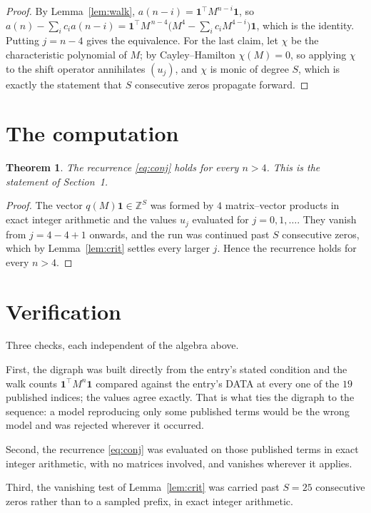 \documentclass[11pt,a4paper]{article}
\theoremstyle{plain}
\newtheorem{theorem}{Theorem}
\theoremstyle{definition}
\begin{document}
\begin{proof}
By Lemma~\ref{lem:walk}, $a(n-i)=\mathbf{1}^{\!\top}M^{n-i}\mathbf{1}$, so
$a(n)-\sum_i c_i a(n-i)
=\mathbf{1}^{\!\top}M^{\,n-4}\bigl(M^{4}-\sum_i c_i M^{4-i}\bigr)
\mathbf{1}$, which is the identity. Putting $j=n-4$ gives the equivalence. For the
last claim, let $\chi$ be the characteristic polynomial of $M$; by Cayley--Hamilton
$\chi(M)=0$, so applying $\chi$ to the shift operator annihilates $(u_j)$, and $\chi$ is
monic of degree $S$, which is exactly the statement that $S$ consecutive zeros propagate
forward.
\end{proof}

\section{The computation}

\begin{theorem}
The recurrence \eqref{eq:conj} holds for every $n>4$. This is the statement of
Section~1.
\end{theorem}

\begin{proof}
The vector $q(M)\mathbf{1}\in\mathbb{Z}^{S}$ was formed by $4$ matrix--vector
products in exact integer arithmetic and the values $u_j$ evaluated for
$j=0,1,\dots$. They vanish from $j=4-4+1$ onwards, and the run was continued past
$S$ consecutive zeros, which by Lemma~\ref{lem:crit} settles every larger $j$. Hence the
recurrence holds for every $n>4$.
\end{proof}

\section{Verification}

Three checks, each independent of the algebra above.

First, the digraph was built directly from the entry's stated condition and the walk counts
$\mathbf{1}^{\!\top}M^{n}\mathbf{1}$ compared against the entry's DATA at every one of
the $19$ published indices; the values agree exactly. That is what ties the digraph to
the sequence: a model reproducing only some published terms would be the wrong model and
was rejected wherever it occurred.

Second, the recurrence \eqref{eq:conj} was evaluated on those published terms in exact
integer arithmetic, with no matrices involved, and vanishes wherever it applies.

Third, the vanishing test of Lemma~\ref{lem:crit} was carried past $S=25$ consecutive
zeros rather than to a sampled prefix, in exact integer arithmetic.
\end{document}
